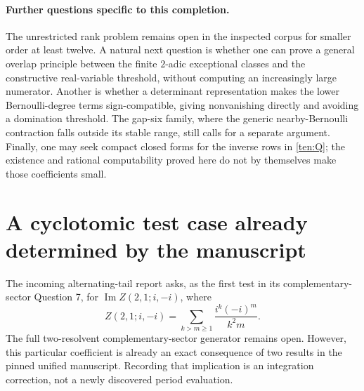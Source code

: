 \documentclass[11pt]{article}
\theoremstyle{definition}
\theoremstyle{remark}
\numberwithin{equation}{section}
\newcommand{\Imag}{\operatorname{Im}}
\begin{document}
\paragraph{Further questions specific to this completion.}
The unrestricted rank problem remains open in the inspected corpus
for smaller order at least twelve.  A natural next question is whether
one can prove a general overlap principle between the finite
$2$-adic exceptional classes and the constructive real-variable
threshold, without computing an increasingly large numerator.
Another is whether a determinant representation makes the lower
Bernoulli-degree terms sign-compatible, giving nonvanishing directly
and avoiding a domination threshold.  The gap-six family, where the
generic nearby-Bernoulli contraction falls outside its stable range,
still calls for a separate argument.  Finally, one may seek compact
closed forms for the inverse rows in \eqref{ten:Q}; the existence
and rational computability proved here do not by themselves make
those coefficients small.


\section{A cyclotomic test case already determined by the manuscript}
\label{audit:cyclo}

The incoming alternating-tail report asks, as the first test in its
complementary-sector Question 7, for
$\Imag Z(2,1;i,-i)$, where
\[
 Z(2,1;i,-i)=\sum_{k>m\ge1}\frac{i^k(-i)^m}{k^2m}.
\]
The full two-resolvent complementary-sector generator remains open.
However, this particular coefficient is already an exact consequence of
two results in the pinned unified manuscript. Recording that implication
is an integration correction, not a newly discovered period evaluation.
\end{document}
